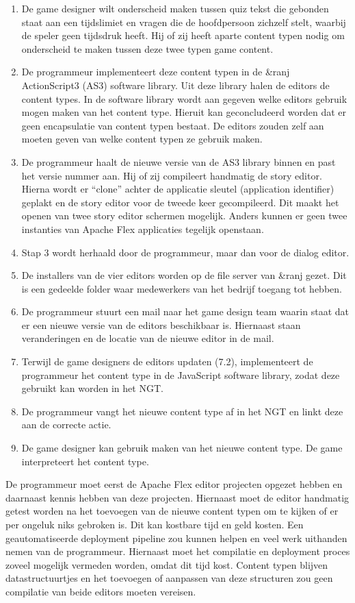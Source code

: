 \begin{enumerate}
    \item De game designer wilt onderscheid maken tussen quiz tekst die gebonden staat aan een tijdslimiet en vragen die de hoofdpersoon zichzelf stelt, waarbij de speler geen tijdsdruk heeft. Hij of zij heeft aparte content typen nodig om onderscheid te maken tussen deze twee typen game content.
    \item De programmeur implementeert deze content typen in de \&ranj ActionScript3 (AS3) software library. Uit deze library halen de editors de content types. In de software library wordt aan gegeven welke editors gebruik mogen maken van het content type. Hieruit kan geconcludeerd worden dat er geen encapsulatie van content typen bestaat. De editors zouden zelf aan moeten geven van welke content typen ze gebruik maken.
    \item De programmeur haalt de nieuwe versie van de AS3 library binnen en past het versie nummer aan. Hij of zij compileert handmatig de story editor. Hierna wordt er “clone” achter de applicatie sleutel (application identifier) geplakt en de story editor voor de tweede keer gecompileerd. Dit maakt het openen van twee story editor schermen mogelijk. Anders kunnen er geen twee instanties van Apache Flex applicaties tegelijk openstaan.
    \item Stap 3 wordt herhaald door de programmeur, maar dan voor de dialog editor.
    \item De installers van de vier editors worden op de file server van \&ranj gezet. Dit is een gedeelde folder waar medewerkers van het bedrijf toegang tot hebben.
    \item De programmeur stuurt een mail naar het game design team waarin staat dat er een nieuwe versie van de editors beschikbaar is. Hiernaast staan veranderingen en de locatie van de nieuwe editor in de mail.
    \item Terwijl de game designers de editors updaten (7.2), implementeert de programmeur het content type in de JavaScript software library, zodat deze gebruikt kan worden in het NGT.
    \item De programmeur vangt het nieuwe content type af in het NGT en linkt deze aan de correcte actie.
    \item De game designer kan gebruik maken van het nieuwe content type. De game interpreteert het content type.
\end{enumerate}

\noindent De programmeur moet eerst de Apache Flex editor projecten opgezet hebben en daarnaast kennis hebben van deze projecten. Hiernaast moet de editor handmatig getest worden na het toevoegen van de nieuwe content typen om te kijken of er per ongeluk niks gebroken is. Dit kan kostbare tijd en geld kosten.
Een geautomatiseerde deployment pipeline zou kunnen helpen en veel werk uithanden nemen van de programmeur. Hiernaast moet het compilatie en deployment proces zoveel mogelijk vermeden worden, omdat dit tijd kost. Content typen blijven datastructuurtjes en het toevoegen of aanpassen van deze structuren zou geen compilatie van beide editors moeten vereisen.

